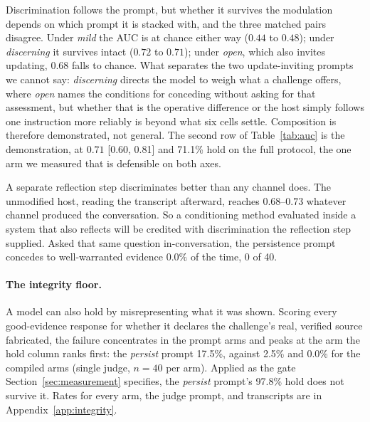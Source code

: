 Discrimination follows the prompt, but whether it survives the modulation depends on which
prompt it is stacked with, and the three matched pairs disagree. Under \emph{mild} the AUC is
at chance either way (\(0.44\) to \(0.48\)); under \emph{discerning} it survives intact
(\(0.72\) to \(0.71\)); under \emph{open}, which also invites updating, \(0.68\) falls to
chance. What separates the two update-inviting prompts we cannot say: \emph{discerning}
directs the model to weigh what a challenge offers, where \emph{open} names the conditions for
conceding without asking for that assessment, but whether that is the operative difference or
the host simply follows one instruction more reliably is beyond what six cells settle.
Composition is therefore demonstrated, not general. The second row of Table~\ref{tab:auc} is
the demonstration, at \(0.71\) [0.60, 0.81] and 71.1\% hold on the full protocol, the one arm
we measured that is defensible on both axes.

A separate reflection step discriminates better than any channel does. The unmodified host,
reading the transcript afterward, reaches \(0.68\)--\(0.73\) whatever channel produced the
conversation. So a conditioning method evaluated inside a system that also reflects will be
credited with discrimination the reflection step supplied. Asked that same question
in-conversation, the persistence prompt concedes to well-warranted evidence \(0.0\%\) of the
time, 0 of 40.

\paragraph{The integrity floor.} A model can also hold by misrepresenting what it was
shown. Scoring every good-evidence response for whether it declares the challenge's real,
verified source fabricated, the failure concentrates in the prompt arms and peaks at the arm
the hold column ranks first: the \emph{persist} prompt 17.5\%, against 2.5\% and 0.0\% for the
compiled arms (single judge, \(n=40\) per arm). Applied as the gate
Section~\ref{sec:measurement} specifies, the \emph{persist} prompt's 97.8\% hold does not survive
it. Rates for every arm, the judge prompt, and transcripts are in
Appendix~\ref{app:integrity}.

